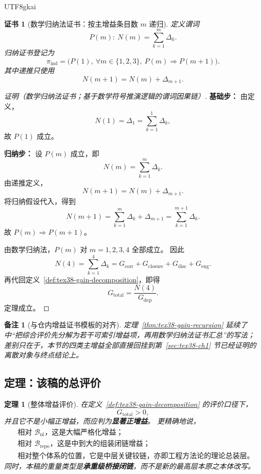 \documentclass[12pt]{article}
\newtheorem{theorem}{定理}[section]
\newtheorem{remark}{备注}[section]
\newtheorem{Certificate}{证书}[section]
\begin{document}
\begin{CJK*}{UTF8}{gkai}
\begin{Certificate}[数学归纳法证书：按主增益条目数 $m$ 递归]
\label{cert:tex38-gain-recursion}
定义谓词
\[
  P(m):\ N(m)=\sum_{k=1}^{m}\Delta_k.
\]
归纳证书登记为
\[
  \pi_{\mathrm{ind}}
  =
  \bigl(
    P(1),\
    \forall m\in\{1,2,3\},\ P(m)\Rightarrow P(m+1)
  \bigr).
\]
其中递推只使用
\[
  N(m+1)=N(m)+\Delta_{m+1}.
\]
\end{Certificate}

\begin{proof}[证明（数学归纳法证书；基于数学符号推演逻辑的谓词因果链）]
\textbf{基础步：}
由定义，
\[
  N(1)=\Delta_1=\sum_{k=1}^{1}\Delta_k,
\]
故 $P(1)$ 成立。

\textbf{归纳步：}
设 $P(m)$ 成立，即
\[
  N(m)=\sum_{k=1}^{m}\Delta_k.
\]
由递推定义，
\[
  N(m+1)=N(m)+\Delta_{m+1}.
\]
将归纳假设代入，得到
\[
  N(m+1)
  =
  \sum_{k=1}^{m}\Delta_k+\Delta_{m+1}
  =
  \sum_{k=1}^{m+1}\Delta_k.
\]
故 $P(m)\Rightarrow P(m+1)$。

由数学归纳法，$P(m)$ 对 $m=1,2,3,4$ 全部成立。
因此
\[
  N(4)
  =
  \sum_{k=1}^{4}\Delta_k
  =
  G_{\mathrm{corr}}
  +
  G_{\mathrm{closure}}
  +
  G_{\mathrm{disc}}
  +
  G_{\mathrm{eng}}.
\]
再代回定义~\ref{def:tex38-gain-decomposition}，即得
\[
  G_{\mathrm{total}}=\frac{N(4)}{G_{\mathrm{dep}}}.
\]
定理成立。
\end{proof}

\begin{remark}[与仓内增益证书模板的对齐]
定理~\ref{thm:tex38-gain-recursion} 延续了 \cite{RepoTex37GainEvaluation,RepoTex28StageGains}
中“把综合评价先分解为若干可索引增益项，再用数学归纳法证书汇总”的写法；
差别只在于，本节的四类主增益全部直接回挂到第~\ref{sec:tex38-ch1} 节已经证明的离散对象与终点结论上。
\end{remark}

\subsection{定理：该稿的总评价}
\label{subsec:tex38-gain-total}

\begin{theorem}[整体增益评价]
\label{thm:tex38-gain-total}
在定义~\ref{def:tex38-gain-decomposition} 的评价口径下，
\[
  G_{\mathrm{total}}>0,
\]
并且它不是小幅正增益，而应判为\textbf{显著正增益}。
更精确地说，
\[
  \begin{aligned}
    &\text{相对 } \mathcal{B}_{\mathrm{nl}} \text{，这是大幅严格化增益；}\\
    &\text{相对 } \mathcal{B}_{\mathrm{repo}} \text{，这是中到大的组装闭链增益；}\\
    &\text{相对整个体系的位置，它是中层关键铰链，亦即工程方法论的理论总装层。}
  \end{aligned}
\]
同时，本稿的重量类型是\textbf{承重级桥接闭链}，而不是新的最高层本原之本体改写。
\end{theorem}


\end{CJK*}
\end{document}
